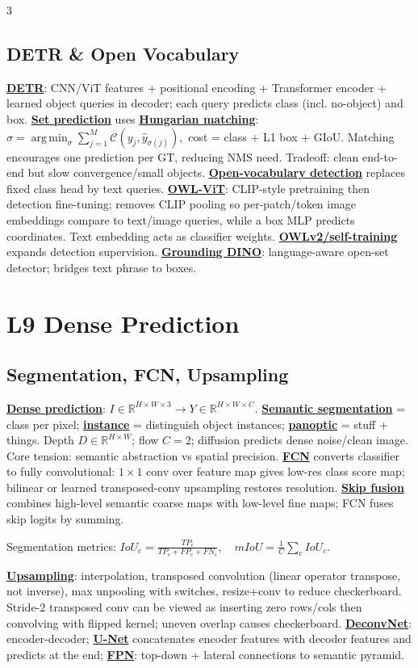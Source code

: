 \documentclass{article}
\numberwithin{equation}{subsection}
\newcommand{\lowterm}[1]{\textbf{\underline{#1}}}
\newcommand{\R}{\mathbb{R}}
\DeclareMathOperator*{\argmin}{arg\,min}
\begin{document}
\begin{multicols*}{3}
\subsection{DETR \& Open Vocabulary}
\lowterm{DETR}: CNN/ViT features + positional encoding + Transformer encoder + learned object queries in decoder; each query predicts class (incl. no-object) and box. \lowterm{Set prediction} uses \lowterm{Hungarian matching}:
\(
\hat\sigma=\argmin_\sigma\sum_{j=1}^M \mathcal C(y_j,\hat y_{\sigma(j)}),
\)
cost = class + L1 box + GIoU. Matching encourages one prediction per GT, reducing NMS need. Tradeoff: clean end-to-end but slow convergence/small objects.
\lowterm{Open-vocabulary detection} replaces fixed class head by text queries. \lowterm{OWL-ViT}: CLIP-style pretraining then detection fine-tuning; removes CLIP pooling so per-patch/token image embeddings compare to text/image queries, while a box MLP predicts coordinates. Text embedding acts as classifier weights. \lowterm{OWLv2/self-training} expands detection supervision. \lowterm{Grounding DINO}: language-aware open-set detector; bridges text phrase to boxes.

\section{L9 Dense Prediction}
\subsection{Segmentation, FCN, Upsampling}
\lowterm{Dense prediction}: $I\in\R^{H\times W\times3}\to Y\in\R^{H\times W\times C}$. \lowterm{Semantic segmentation} = class per pixel; \lowterm{instance} = distinguish object instances; \lowterm{panoptic} = stuff + things. Depth $D\in\R^{H\times W}$; flow $C=2$; diffusion predicts dense noise/clean image. Core tension: semantic abstraction vs spatial precision.
\lowterm{FCN} converts classifier to fully convolutional: $1\times1$ conv over feature map gives low-res class score map; bilinear or learned transposed-conv upsampling restores resolution. \lowterm{Skip fusion} combines high-level semantic coarse maps with low-level fine maps; FCN fuses skip logits by summing. 

Segmentation metrics:
\(
IoU_c=\frac{TP_c}{TP_c+FP_c+FN_c},\quad mIoU=\frac1C\sum_cIoU_c.
\)

\lowterm{Upsampling}: interpolation, transposed convolution (linear operator transpose, not inverse), max unpooling with switches, resize+conv to reduce checkerboard. Stride-2 transposed conv can be viewed as inserting zero rows/cols then convolving with flipped kernel; uneven overlap causes checkerboard. \lowterm{DeconvNet}: encoder-decoder; \lowterm{U-Net} concatenates encoder features with decoder features and predicts at the end; \lowterm{FPN}: top-down + lateral connections to semantic pyramid.


\end{multicols*}
\end{document}

